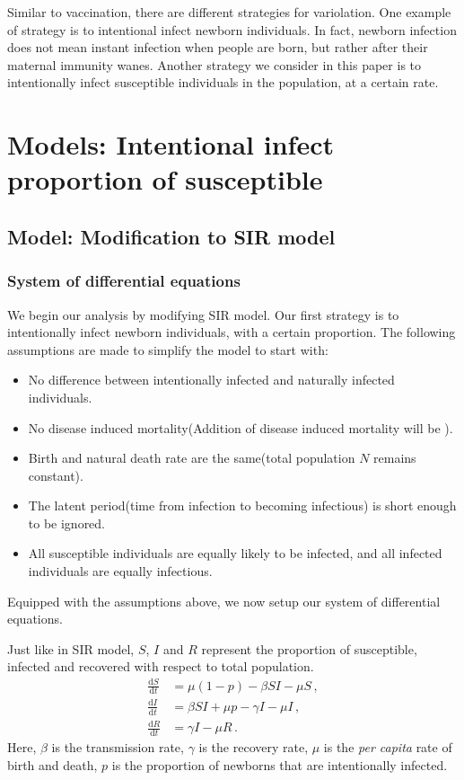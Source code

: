 \documentclass[12pt]{article}
\newcommand\dbyd[2]{\frac{\mathrm d{#1}}{\mathrm d{#2}}}
\begin{document}
Similar to vaccination, there are different strategies for variolation. One example of strategy is to intentional infect newborn individuals. In fact, newborn infection does not mean instant infection when people are born, but rather after their maternal immunity wanes. Another strategy we consider in this paper is to intentionally infect susceptible individuals in the population, at a certain rate. 

\section{Models: Intentional infect proportion of susceptible}
\subsection{Model: Modification to SIR model}
\subsubsection{System of differential equations}
We begin our analysis by modifying SIR model. Our first strategy is to intentionally infect newborn individuals, with a certain proportion.  The following assumptions are made to simplify the model to start with:
\begin{itemize}
\item No difference between intentionally infected and naturally infected individuals.
\item No disease induced mortality(Addition of disease induced mortality will be ).
\item Birth and natural death rate are the same(total population $N$ remains constant).
\item The latent period(time from infection to becoming infectious) is short enough to be ignored.
\item All susceptible individuals are equally likely to be infected, and all infected individuals are equally infectious.
\end{itemize}
Equipped with the assumptions above, we now setup our system of differential equations.

Just like in SIR model, $S$, $I$ and $R$ represent the proportion of susceptible, infected and recovered with respect to total population.
\begin{equation}\label{1}
\begin{split}
\dbyd{S}{t}&=\mu(1-p)- \beta SI-\mu S \,,\\
\dbyd{I}{t}&=\beta SI+\mu p-\gamma I -\mu I\,,\\
\dbyd{R}{t}&=\gamma I-\mu R\,.
\end{split}
\end{equation}
Here, $\beta$ is the transmission rate, $\gamma$ is the recovery rate,
$\mu$ is the \emph{per capita} rate of birth and death, $p$ is the
proportion of newborns that are intentionally infected.
\end{document}
